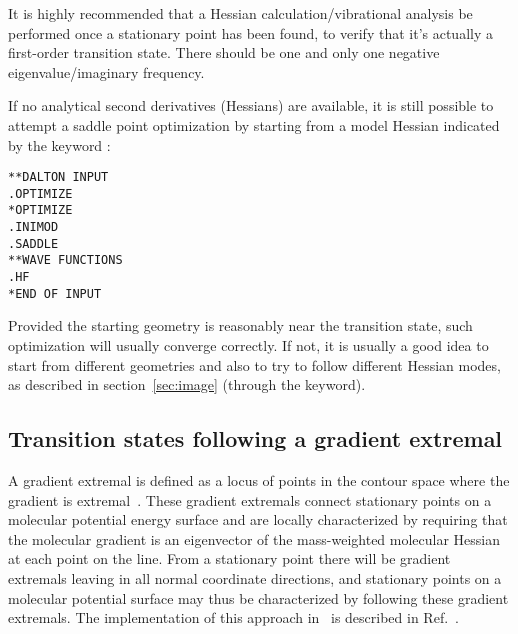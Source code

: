 It is highly recommended that a Hessian calculation/vibrational
analysis be performed once a stationary point has been found, to
verify that it's actually a first-order transition state. There should
be one and only one negative eigenvalue/imaginary frequency.

If no analytical second derivatives (Hessians) are available, it is
still possible to attempt a saddle point optimization by starting from
a model Hessian indicated by the keyword :
\begin{verbatim}
**DALTON INPUT
.OPTIMIZE
*OPTIMIZE
.INIMOD
.SADDLE
**WAVE FUNCTIONS
.HF
*END OF INPUT
\end{verbatim}
Provided the starting geometry is reasonably near the transition
state, such optimization will usually converge correctly. If not, it
is usually a good idea to start from different geometries and also to
try to follow different Hessian modes, as described in
section~\ref{sec:image} (through the  keyword).



\subsection{Transition states following a gradient
extremal}\label{sec:gradext}

\begin{center}
\end{center}

A gradient extremal is defined as a locus of points in the contour
space where the gradient is extremal~\cite{pjhjajthtca73}. These
gradient extremals connect
stationary points on a molecular potential energy surface and are
locally characterized by requiring that the molecular gradient is an
eigenvector of the mass-weighted molecular Hessian at each point on
the line. From a stationary point there will be gradient extremals
leaving in all normal coordinate directions, and stationary points
on a molecular potential surface may thus be characterized by
following these gradient extremals. The implementation of this approach
in \dalton\ is described in Ref.~\cite{pjhjajthtca73}.

